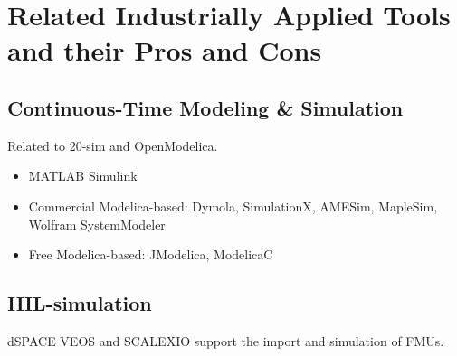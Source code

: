 \section{Related Industrially Applied Tools and their Pros and Cons}


\subsection{Continuous-Time Modeling \& Simulation}

Related to {20-sim} and {OpenModelica}.
\begin{itemize}
  \item MATLAB Simulink
  \item Commercial Modelica-based: Dymola, SimulationX, AMESim, MapleSim, Wolfram SystemModeler
  \item Free Modelica-based: JModelica, ModelicaC
\end{itemize}


\subsection{HIL-simulation}
dSPACE VEOS and SCALEXIO \cite{dSPACEfmi} support the import and simulation of FMUs.

